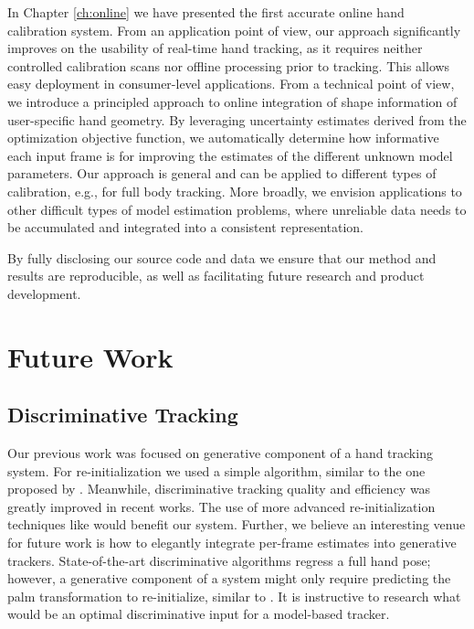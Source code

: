 In Chapter \ref{ch:online} we have presented the first accurate online hand calibration system. 
From an application point of view, our approach significantly improves on the usability of real-time hand tracking, as it requires neither controlled calibration scans nor offline processing prior to tracking. This allows easy deployment in consumer-level applications. From a technical point of view, we introduce a principled approach to online integration of shape information of user-specific hand geometry. By leveraging uncertainty estimates derived from the optimization objective function, we automatically determine how informative each input frame is for improving the estimates of the different unknown model parameters. Our approach is general and can be applied to different types of calibration, e.g., for full body tracking. More broadly, we envision applications to other difficult types of model estimation problems, where unreliable data needs to be accumulated and integrated into a consistent representation.

By fully disclosing our source code and data we ensure that our method and results are reproducible, as well as facilitating future research and product development. 

\section {Future Work}

\subsection*{Discriminative Tracking}
Our previous work was focused on generative component of a hand tracking system. For re-initialization we used a simple algorithm, similar to the one proposed by \cite{qian2014realtime}. Meanwhile, discriminative tracking quality and efficiency was greatly improved in recent works. 
The use of more advanced re-initialization techniques like \cite{oberweger2017deepprior++} would benefit our system. Further, we believe an interesting venue for future work is how to elegantly integrate per-frame estimates into generative trackers. State-of-the-art discriminative algorithms regress a full hand pose; however, a generative component of a system might only require predicting the palm transformation to re-initialize, similar to \cite{taylor2017articulated}. It is instructive to research what would be an optimal discriminative input for a model-based tracker.

